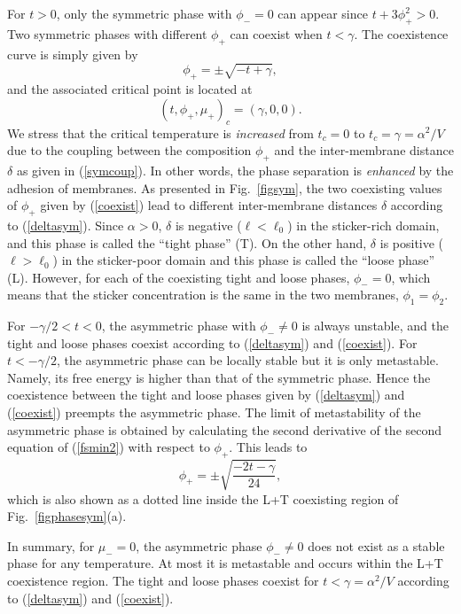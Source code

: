 For $t > 0$, only the symmetric phase with $\phi_-=0$ can appear
since $t+3\phi_+^2>0$.
Two symmetric phases with different $\phi_+$ can coexist
when $t < \gamma$.
%
The coexistence curve is simply given by
\begin{equation}
\phi_+ = \pm \sqrt{- t+ \gamma},
\label{coexist}
\end{equation}
and the associated critical point is located at
\begin{equation}
(t, \phi_+, \mu_+)_c =(\gamma, 0, 0).
\label{critical}
\end{equation}
%
We stress that
the critical temperature is {\it increased}
from $t_c=0$ to $t_c=\gamma = \alpha^2/V$ due to the coupling between the
composition $\phi_+$ and the inter-membrane distance $\delta$ as given
in (\ref{symcoup}).
In other words, the phase separation is {\it enhanced} by the adhesion
of membranes.
As presented in Fig.\ \ref{figsym}, the two coexisting
values of $\phi_+$ given by (\ref{coexist}) lead to different
inter-membrane distances $\delta$ according to (\ref{deltasym}).
Since $\alpha >0$,
$\delta$ is negative ($\ell < \ell_0$) in the sticker-rich domain,
and this phase is called the ``tight phase'' (T).
On the other hand, $\delta$ is positive ($\ell > \ell_0$)
in the sticker-poor domain and this phase is called the
``loose phase'' (L).
However, for each of the coexisting tight and loose phases, $\phi_-=0$,
which means that the sticker concentration is the same in the two
membranes, $\phi_1=\phi_2$.


For $-\gamma/2 < t < 0$, the asymmetric phase with $\phi_- \neq 0$
is always unstable, and the tight and loose phases coexist according to
(\ref{deltasym}) and (\ref{coexist}).
For $t < -\gamma/2$, the asymmetric phase can be locally stable but it is
only metastable.
Namely, its free energy is higher than that of the symmetric phase.
Hence the coexistence between the tight and loose phases
given by (\ref{deltasym}) and (\ref{coexist}) preempts the asymmetric phase.
The limit of metastability of the asymmetric phase is obtained by calculating
the second derivative of the second equation of (\ref{fsmin2}) with respect
to $\phi_+$.
This leads to
%
\begin{equation}
\phi_+ = \pm \sqrt{\frac{- 2t- \gamma}{24}},
\label{meta}
\end{equation}
%
which is also shown as a dotted line inside the L+T coexisting
region of Fig.\ \ref{figphasesym}(a).


In summary, for $\mu_-=0$, the asymmetric phase $\phi_- \neq 0$
does not exist as a stable phase for any temperature.
At most it is metastable and occurs within the L+T coexistence region.
The tight and loose phases coexist for $t < \gamma =\alpha^2/V$
according to (\ref{deltasym}) and (\ref{coexist}).


